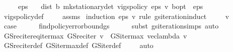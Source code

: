 \begin{isabellebody}
\ \ \ {\isachardoublequoteopen}{}\ {\isacharless}{\kern0pt}\ eps{\isachardoublequoteclose}\isanewline
\ \ \ {\isachardoublequoteopen}dist\ {\isacharparenleft}{\kern0pt}{\isasymnu}\isactrlsub b\ {\isacharparenleft}{\kern0pt}mk{\isacharunderscore}{\kern0pt}stationary{\isacharunderscore}{\kern0pt}det\ {\isacharparenleft}{\kern0pt}vi{\isacharunderscore}{\kern0pt}gs{\isacharunderscore}{\kern0pt}policy\ eps\ v{\isacharparenright}{\kern0pt}{\isacharparenright}{\kern0pt}{\isacharparenright}{\kern0pt}\ {\isasymnu}\isactrlsub b{\isacharunderscore}{\kern0pt}opt\ {\isacharless}{\kern0pt}\ eps{\isachardoublequoteclose}\isanewline
%
\isadelimproof
\ \ %
\endisadelimproof
%
\isatagproof
{}\isamarkupfalse%
\ vi{\isacharunderscore}{\kern0pt}gs{\isacharunderscore}{\kern0pt}policy{\isacharunderscore}{\kern0pt}def\ \isanewline
\ \ \isamarkupfalse%
\ assms\isanewline
{}\isamarkupfalse%
\ {\isacharparenleft}{\kern0pt}induction\ eps\ v\ rule{\isacharcolon}{\kern0pt}\ gs{\isacharunderscore}{\kern0pt}iteration{\isachardot}{\kern0pt}induct{\isacharparenright}{\kern0pt}\isanewline
\ \ \isamarkupfalse%
\ {\isacharparenleft}{\kern0pt}{}\ v{\isacharparenright}{\kern0pt}\isanewline
\ \ \isamarkupfalse%
\ \isamarkupfalse%
\ {\isacharquery}{\kern0pt}case\isanewline
\ \ \ \ \isamarkupfalse%
\ find{\isacharunderscore}{\kern0pt}policy{\isacharunderscore}{\kern0pt}error{\isacharunderscore}{\kern0pt}bound{\isacharunderscore}{\kern0pt}gs\isanewline
\ \ \ \ \isamarkupfalse%
\ {\isacharparenleft}{\kern0pt}subst\ gs{\isacharunderscore}{\kern0pt}iteration{\isachardot}{\kern0pt}simps{\isacharparenright}{\kern0pt}\ auto\isanewline
{}\isamarkupfalse%
%
\endisatagproof
{\isafoldproof}%
%
\isadelimproof
\isanewline
%
\endisadelimproof
\isanewline
{}\isamarkupfalse%
\ GS{\isacharunderscore}{\kern0pt}rec{\isacharunderscore}{\kern0pt}iter{\isacharunderscore}{\kern0pt}eq{\isacharunderscore}{\kern0pt}iter{\isacharunderscore}{\kern0pt}max{\isacharcolon}{\kern0pt}\ {\isachardoublequoteopen}GS{\isacharunderscore}{\kern0pt}rec{\isacharunderscore}{\kern0pt}iter\ v\ {\isacharequal}{\kern0pt}\ GS{\isacharunderscore}{\kern0pt}iter{\isacharunderscore}{\kern0pt}max\ {\isacharparenleft}{\kern0pt}vec{\isacharunderscore}{\kern0pt}lambda\ v{\isacharparenright}{\kern0pt}{\isachardoublequoteclose}\isanewline
%
\isadelimproof
\ \ %
\endisadelimproof
%
\isatagproof
{}\isamarkupfalse%
\ GS{\isacharunderscore}{\kern0pt}rec{\isacharunderscore}{\kern0pt}iter{\isacharunderscore}{\kern0pt}def\ GS{\isacharunderscore}{\kern0pt}iter{\isacharunderscore}{\kern0pt}max{\isacharunderscore}{\kern0pt}def\ GS{\isacharunderscore}{\kern0pt}iter{\isacharunderscore}{\kern0pt}def\ \isanewline
\ \ \isamarkupfalse%
\ auto%
\endisatagproof
{\isafoldproof}%
%
\isadelimproof
\isanewline
%
\endisadelimproof
{}\isamarkupfalse%
\isanewline
%
\isadelimtheory
\isanewline
%
\endisadelimtheory
%
\isatagtheory
{}\isamarkupfalse%
%
\endisatagtheory
{\isafoldtheory}%
%
\isadelimtheory
%
\endisadelimtheory
%
\end{isabellebody}%
